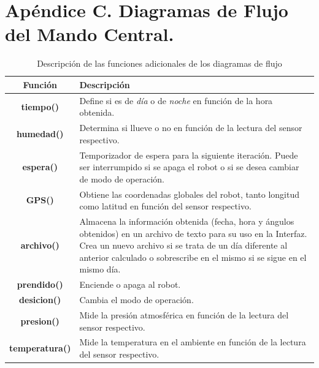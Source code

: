 \chapter{Apéndice C. Diagramas de Flujo del Mando Central.}

\begin{table}[H]
  \centering
  \caption{Descripción de las funciones adicionales de los diagramas de flujo}
    \begin{tabular}{@{}|c|p{10cm}|}
    \hline
    \textbf{Función} & \textbf{Descripción} \\
    \hline \hline
    \textbf{tiempo()} & Define si es de \textit{día} o de \textit{noche} en función de la hora obtenida. \\
    \hline
    \textbf{humedad()} & Determina si llueve o no en función de la lectura del sensor respectivo. \\
    \hline
    \textbf{espera()} & Temporizador de espera para la siguiente iteración. Puede ser interrumpido si se apaga el robot o si se desea cambiar de modo de operación. \\
    \hline
    \textbf{GPS()} & Obtiene las coordenadas globales del robot, tanto longitud como latitud en función del sensor respectivo. \\
    \hline
    \textbf{archivo()} & Almacena la información obtenida (fecha, hora y ángulos obtenidos) en un archivo de texto para su uso en la Interfaz. Crea un nuevo archivo si se trata de un día diferente al anterior calculado o sobrescribe en el mismo si se sigue en el mismo día.\\
    \hline
    \textbf{prendido()} & Enciende o apaga al robot. \\
    \hline
    \textbf{desicion()} & Cambia el modo de operación. \\
    \hline
    \textbf{presion()} & Mide la presión atmosférica en función de la lectura del sensor respectivo. \\
    \hline
    \textbf{temperatura()} & Mide la temperatura en el ambiente en función de la lectura del sensor respectivo. \\
    \hline
    \end{tabular}%
  \label{tab:dia_flu2}%
\end{table}%

